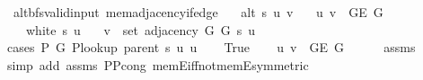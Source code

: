 \begin{isabellebody}
\endisatagproof
{\isafoldproof}%
%
\isadelimproof
\isanewline
%
\endisadelimproof
\isanewline
{}\isamarkupfalse%
\ {\isacharparenleft}{\kern0pt}\ alt{\isacharunderscore}{\kern0pt}bfs{\isacharunderscore}{\kern0pt}valid{\isacharunderscore}{\kern0pt}input{\isacharparenright}{\kern0pt}\ mem{\isacharunderscore}{\kern0pt}adjacency{\isacharunderscore}{\kern0pt}if{\isacharunderscore}{\kern0pt}edge{\isacharcolon}{\kern0pt}\isanewline
\ \ \ {\isachardoublequoteopen}alt\ s\ u\ v{\isachardoublequoteclose}\isanewline
\ \ \ {\isachardoublequoteopen}{\isacharbraceleft}{\kern0pt}u{\isacharcomma}{\kern0pt}\ v{\isacharbraceright}{\kern0pt}\ {\isasymin}\ G{\isachardot}{\kern0pt}E\ G{\isachardoublequoteclose}\isanewline
\ \ \ {\isachardoublequoteopen}{\isasymnot}\ white\ s\ u{\isachardoublequoteclose}\isanewline
\ \ \ {\isachardoublequoteopen}v\ {\isasymin}\ set\ {\isacharparenleft}{\kern0pt}adjacency\ G{}\ G{}\ s\ u{\isacharparenright}{\kern0pt}{\isachardoublequoteclose}\isanewline
%
\isadelimproof
%
\endisadelimproof
%
\isatagproof
{}\isamarkupfalse%
\ {\isacharparenleft}{\kern0pt}cases\ {\isachardoublequoteopen}P{\isacharprime}{\kern0pt}\ G{}\ {\isacharparenleft}{\kern0pt}P{\isacharunderscore}{\kern0pt}lookup\ {\isacharparenleft}{\kern0pt}parent\ s{\isacharparenright}{\kern0pt}\ u{\isacharparenright}{\kern0pt}\ u{\isachardoublequoteclose}{\isacharparenright}{\kern0pt}\isanewline
\ \ \isamarkupfalse%
\ True\isanewline
\ \ \isamarkupfalse%
\ {\isachardoublequoteopen}{\isacharbraceleft}{\kern0pt}u{\isacharcomma}{\kern0pt}\ v{\isacharbraceright}{\kern0pt}\ {\isasymin}\ G{\isachardot}{\kern0pt}E\ G{}{\isachardoublequoteclose}\isanewline
\ \ \ \ \isamarkupfalse%
\ assms{\isacharparenleft}{\kern0pt}{}{\isacharparenright}{\kern0pt}\isanewline
\ \ \ \ \isamarkupfalse%
\ {\isacharparenleft}{\kern0pt}simp\ add{\isacharcolon}{\kern0pt}\ assms{\isacharparenleft}{\kern0pt}{}{\isacharparenright}{\kern0pt}\ P{\isacharunderscore}{\kern0pt}P{\isacharprime}{\kern0pt}{\isacharprime}{\kern0pt}{\isacharunderscore}{\kern0pt}cong\ mem{\isacharunderscore}{\kern0pt}E{}{\isacharunderscore}{\kern0pt}iff{\isacharunderscore}{\kern0pt}not{\isacharunderscore}{\kern0pt}mem{\isacharunderscore}{\kern0pt}E{}{\isacharbrackleft}{\kern0pt}symmetric{\isacharbrackright}{\kern0pt}{\isacharparenright}{\kern0pt}\isanewline
\ \ \isamarkupfalse%

\end{isabellebody}
